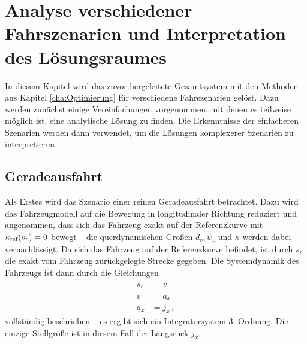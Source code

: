 \chapter{Analyse verschiedener Fahrszenarien und Interpretation des Lösungsraumes}\label{cha:Ergebnisse}
In diesem Kapitel wird das zuvor hergeleitete Gesamtsystem mit den Methoden aus Kapitel \ref{cha:Optimierung} für verschiedene Fahrszenarien gelöst. Dazu werden zunächst einige Vereinfachungen vorgenommen, mit denen es teilweise möglich ist, eine analytische Lösung zu finden. Die Erkenntnisse der einfacheren Szenarien werden dann verwendet, um die Lösungen komplexerer Szenarien zu interpretieren. 

\section{Geradeausfahrt}\label{sec:Geradeausfahrt}
Als Erstes wird das Szenario einer reinen Geradeausfahrt betrachtet. Dazu wird das Fahrzeugmodell auf die Bewegung in longitudinaler Richtung reduziert und angenommen, dass sich das Fahrzeug exakt auf der Referenzkurve mit $\kappa_{\textrm{ref}}(s_r) = 0$ bewegt -- die querdynamischen Größen $d_r, \psi_r$ und $\kappa$ werden dabei vernachlässigt. Da sich das Fahrzeug auf der Referenzkurve befindet, ist durch $s_r$ die exakt vom Fahrzeug zurückgelegte Strecke gegeben. Die Systemdynamik des Fahrzeugs ist dann durch die Gleichungen 
\begin{align}
\dot{s}_r &= v \\
\dot{v} &= a_x \\
\dot{a}_x &= j_x \,,
\end{align}
vollständig beschrieben -- es ergibt sich ein Integratorsystem 3. Ordnung. Die einzige Stellgröße ist in diesem Fall der Längsruck $j_x$.

